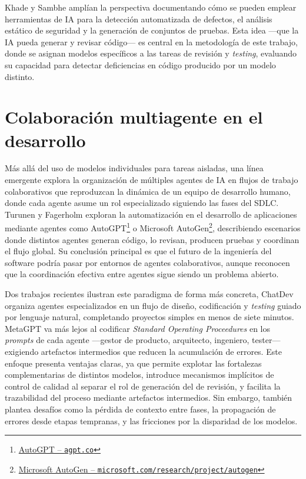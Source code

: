 Khade y Sambhe \cite{Khade:2025:AIinSD} amplían la perspectiva documentando cómo se pueden emplear herramientas de \ac{IA} para la detección automatizada de defectos, el análisis estático de seguridad y la generación de conjuntos de pruebas. Esta idea ---que la \ac{IA} pueda generar y revisar código--- es central en la metodología de este trabajo, donde se asignan modelos específicos a las tareas de revisión y \textit{testing}, evaluando su capacidad para detectar deficiencias en código producido por un modelo distinto.

\section{Colaboración multiagente en el desarrollo} \label{sec:colaboracion-multiagente}

Más allá del uso de modelos individuales para tareas aisladas, una línea emergente explora la organización de múltiples agentes de \ac{IA} en flujos de trabajo colaborativos que reproduzcan la dinámica de un equipo de desarrollo humano, donde cada agente asume un rol especializado siguiendo las fases del \ac{SDLC}. Turunen y Fagerholm \cite{Turunen:2023:FromIdeas} exploran la automatización en el desarrollo de aplicaciones mediante agentes como AutoGPT\footnote{\href{https://agpt.co}{AutoGPT -- \texttt{agpt.co}}} o Microsoft AutoGen\footnote{\href{https://www.microsoft.com/research/project/autogen}{Microsoft AutoGen -- \texttt{microsoft.com/research/project/autogen}}}, describiendo escenarios donde distintos agentes generan código, lo revisan, producen pruebas y coordinan el flujo global. Su conclusión principal es que el futuro de la ingeniería del software podría pasar por entornos de agentes colaborativos, aunque reconocen que la coordinación efectiva entre agentes sigue siendo un problema abierto.

Dos trabajos recientes ilustran este paradigma de forma más concreta, ChatDev \cite{Qian:2024:ChatDev} organiza agentes especializados en un flujo de diseño, codificación y \textit{testing} guiado por lenguaje natural, completando proyectos simples en menos de siete minutos. MetaGPT \cite{Hong:2024:MetaGPT} va más lejos al codificar \textit{Standard Operating Proceedures} en los \textit{prompts} de cada agente ---gestor de producto, arquitecto, ingeniero, tester--- exigiendo artefactos intermedios que reducen la acumulación de errores. Este enfoque presenta ventajas claras, ya que permite explotar las fortalezas complementarias de distintos modelos, introduce mecanismos implícitos de control de calidad al separar el rol de generación del de revisión, y facilita la trazabilidad del proceso mediante artefactos intermedios. Sin embargo, también plantea desafíos como la pérdida de contexto entre fases, la propagación de errores desde etapas tempranas, y las fricciones por la disparidad de los modelos.

